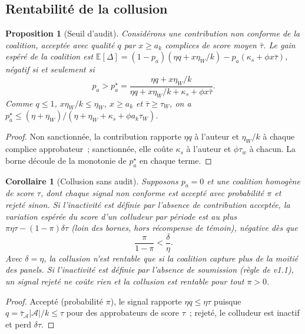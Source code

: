 \documentclass[11pt,a4paper]{article}
\theoremstyle{plain}
\newtheorem{proposition}{Proposition}
\newtheorem{corollaire}{Corollaire}
\theoremstyle{definition}
\theoremstyle{remark}
\newcommand{\1}{\mathbf{1}}
\newcommand{\E}{\mathbb{E}}
\begin{document}
\subsection{Rentabilité de la collusion}

\begin{proposition}[Seuil d'audit]\label{prop:collusion}
Considérons une contribution non conforme de la coalition, acceptée avec
qualité $q$ par $x\ge a_k$ complices de score moyen $\bar\tau$. Le gain
espéré de la coalition est
$\E[\Delta]=(1-p_a)(\eta q+x\eta_W/k)-p_a(\kappa_s+\phi x\bar\tau)$, négatif si
et seulement si
\begin{equation}
p_a>p^\star_a=\frac{\eta q+x\eta_W/k}{\eta q+x\eta_W/k+\kappa_s+\phi x\bar\tau}.
\label{eq:pa}
\end{equation}
Comme $q\le1$, $x\eta_W/k\le\eta_W$, $x\ge a_k$ et $\bar\tau\ge\tau_W$, on a
$p^\star_a\le(\eta+\eta_W)/(\eta+\eta_W+\kappa_s+\phi a_k\tau_W)$.
\end{proposition}
\begin{proof}
Non sanctionnée, la contribution rapporte $\eta q$ à l'auteur et $\eta_W/k$ à
chaque complice approbateur~; sanctionnée, elle coûte $\kappa_s$ à l'auteur et
$\phi\tau_w$ à chacun. La borne découle de la monotonie de $p^\star_a$ en
chaque terme.
\end{proof}

\begin{corollaire}[Collusion sans audit]\label{cor:sansaudit}
Supposons $p_a=0$ et une coalition homogène de score $\tau$, dont chaque
signal non conforme est accepté avec probabilité $\pi$ et rejeté sinon. Si
l'inactivité est définie par l'absence de contribution acceptée, la variation
espérée du score d'un colludeur par période est au plus
$\pi\eta\tau-(1-\pi)\delta\tau$ (loin des bornes, hors récompense de témoin),
négative dès que
\begin{equation}
\frac{\pi}{1-\pi}<\frac{\delta}{\eta}.
\label{eq:sansaudit}
\end{equation}
Avec $\delta=\eta$, la collusion n'est rentable que si la coalition capture plus
de la moitié des panels. Si l'inactivité est définie par l'absence de
soumission (règle de v1.1), un signal rejeté ne coûte rien et la collusion est
rentable pour tout $\pi>0$.
\end{corollaire}
\begin{proof}
Accepté (probabilité $\pi$), le signal rapporte $\eta q\le\eta\tau$ puisque
$q=\bar\tau_{\mathcal{A}}|\mathcal{A}|/k\le\tau$ pour des approbateurs de score
$\tau$~; rejeté, le colludeur est inactif et perd $\delta\tau$.
\end{proof}
\end{document}
